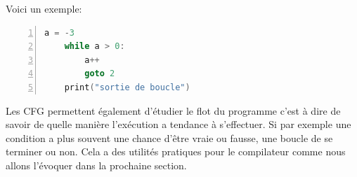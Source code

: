Voici un exemple:
\begin{lstlisting}[numbers=left, language=c, xleftmargin=.35\textwidth, caption={Exemple de boucle}, captionpos=b]
    a = -3
    while a > 0:
        a++
        goto 2
    print("sortie de boucle")
\end{lstlisting}

\begin{center}
\end{center}

Les CFG permettent également d'étudier le flot du programme c'est à dire de savoir de quelle manière l'exécution a tendance à s'effectuer. Si par exemple une condition a plus souvent une chance d'être vraie ou fausse, une boucle de se terminer ou non. Cela a des utilités pratiques pour le compilateur comme nous allons l'évoquer dans la prochaine section.

